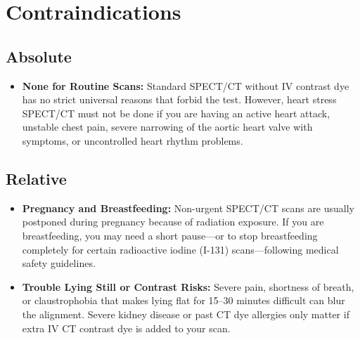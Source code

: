 \section{Contraindications}

\subsection{Absolute}
\begin{itemize}
    \item \textbf{None for Routine Scans:} Standard SPECT/CT without IV contrast dye has no strict universal reasons that forbid the test. However, heart stress SPECT/CT must not be done if you are having an active heart attack, unstable chest pain, severe narrowing of the aortic heart valve with symptoms, or uncontrolled heart rhythm problems.
\end{itemize}

\subsection{Relative}
\begin{itemize}
    \item \textbf{Pregnancy and Breastfeeding:} Non-urgent SPECT/CT scans are usually postponed during pregnancy because of radiation exposure. If you are breastfeeding, you may need a short pause---or to stop breastfeeding completely for certain radioactive iodine (I-131) scans---following medical safety guidelines.
    \item \textbf{Trouble Lying Still or Contrast Risks:} Severe pain, shortness of breath, or claustrophobia that makes lying flat for 15--30 minutes difficult can blur the alignment. Severe kidney disease or past CT dye allergies only matter if extra IV CT contrast dye is added to your scan.
\end{itemize}

